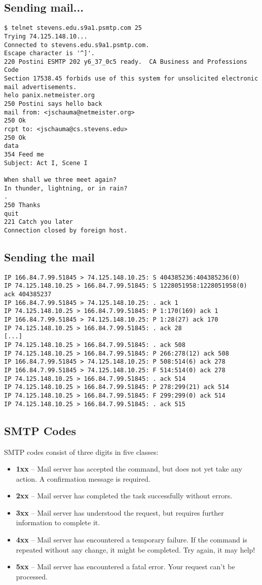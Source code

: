 \documentclass[xga]{xdvislides}
\begin{document}
\subsection{Sending mail...}
\smallish
\begin{verbatim}
$ telnet stevens.edu.s9a1.psmtp.com 25
Trying 74.125.148.10...
Connected to stevens.edu.s9a1.psmtp.com.
Escape character is '^]'.
220 Postini ESMTP 202 y6_37_0c5 ready.  CA Business and Professions Code
Section 17538.45 forbids use of this system for unsolicited electronic
mail advertisements.
helo panix.netmeister.org
250 Postini says hello back
mail from: <jschauma@netmeister.org>
250 Ok
rcpt to: <jschauma@cs.stevens.edu>
250 Ok
data
354 Feed me
Subject: Act I, Scene I

When shall we three meet again?
In thunder, lightning, or in rain?
.
250 Thanks
quit
221 Catch you later
Connection closed by foreign host.
\end{verbatim}
\Normalsize

\subsection{Sending the mail}
\begin{verbatim}
IP 166.84.7.99.51845 > 74.125.148.10.25: S 404385236:404385236(0)
IP 74.125.148.10.25 > 166.84.7.99.51845: S 1228051958:1228051958(0) ack 404385237
IP 166.84.7.99.51845 > 74.125.148.10.25: . ack 1
IP 74.125.148.10.25 > 166.84.7.99.51845: P 1:170(169) ack 1
IP 166.84.7.99.51845 > 74.125.148.10.25: P 1:28(27) ack 170
IP 74.125.148.10.25 > 166.84.7.99.51845: . ack 28
[...]
IP 74.125.148.10.25 > 166.84.7.99.51845: . ack 508
IP 74.125.148.10.25 > 166.84.7.99.51845: P 266:278(12) ack 508
IP 166.84.7.99.51845 > 74.125.148.10.25: P 508:514(6) ack 278
IP 166.84.7.99.51845 > 74.125.148.10.25: F 514:514(0) ack 278
IP 74.125.148.10.25 > 166.84.7.99.51845: . ack 514
IP 74.125.148.10.25 > 166.84.7.99.51845: P 278:299(21) ack 514
IP 74.125.148.10.25 > 166.84.7.99.51845: F 299:299(0) ack 514
IP 74.125.148.10.25 > 166.84.7.99.51845: . ack 515
\end{verbatim}
\Normalsize

\subsection{SMTP Codes}
SMTP codes consist of three digits in five classes:
\begin{itemize}
	\item {\bf 1xx} --  Mail server has accepted the command, but does not yet
		take any action. A confirmation message is required.
	\item {\bf 2xx} --  Mail server has completed the task successfully
		without errors.
	\item {\bf 3xx} --  Mail server has understood the request, but requires
		further information to complete it.
	\item {\bf 4xx} --  Mail server has encountered a temporary failure. If
		the command is repeated without any change, it might be
		completed. Try again, it may help!
	\item {\bf 5xx} --  Mail server has encountered a fatal error. Your
		request can't be processed.
\end{itemize}
\end{document}
